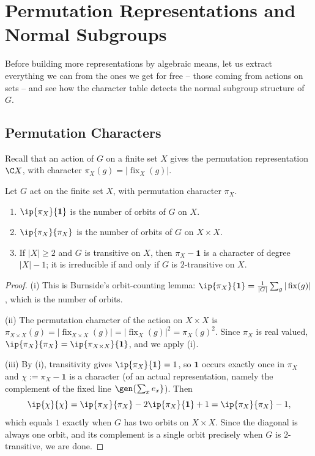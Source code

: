 \section{Permutation Representations and Normal Subgroups}

Before building more representations by algebraic means, let us extract everything we can from the ones we get for free -- those coming from actions on sets -- and see how the character table detects the normal subgroup structure of $G$.

\subsection{Permutation Characters}

Recall that an action of $G$ on a finite set $X$ gives the permutation representation $\C X$, with character $\pi_X(g) = |\operatorname{fix}_X(g)|$.

\begin{proposition}
	Let $G$ act on the finite set $X$, with permutation character $\pi_X$.
	\begin{enumerate}[label=(\roman*)]
		\item $\ip{\pi_X}{\mathbf 1}$ is the number of orbits of $G$ on $X$.
		\item $\ip{\pi_X}{\pi_X}$ is the number of orbits of $G$ on $X\times X$.
		\item If $|X| \geq 2$ and $G$ is transitive on $X$, then $\pi_X - \mathbf 1$ is a character of degree $|X|-1$; it is irreducible if and only if $G$ is $2$-transitive on $X$.
	\end{enumerate}
\end{proposition}
\begin{proof}
	(i) This is Burnside's orbit-counting lemma: $\ip{\pi_X}{\mathbf 1} = \frac1{|G|}\sum_g|\operatorname{fix}(g)|$, which is the number of orbits.

	(ii) The permutation character of the action on $X \times X$ is $\pi_{X\times X}(g) = |\operatorname{fix}_{X\times X}(g)| = |\operatorname{fix}_X(g)|^2 = \pi_X(g)^2$. Since $\pi_X$ is real valued, $\ip{\pi_X}{\pi_X} = \ip{\pi_{X\times X}}{\mathbf 1}$, and we apply (i).

	(iii) By (i), transitivity gives $\ip{\pi_X}{\mathbf 1} = 1$, so $\mathbf 1$ occurs exactly once in $\pi_X$ and $\chi := \pi_X - \mathbf 1$ is a character (of an actual representation, namely the complement of the fixed line $\gen{\sum_x e_x}$). Then
	$$\ip{\chi}{\chi} = \ip{\pi_X}{\pi_X} - 2\ip{\pi_X}{\mathbf 1} + 1 = \ip{\pi_X}{\pi_X} - 1,$$
	which equals $1$ exactly when $G$ has two orbits on $X\times X$. Since the diagonal is always one orbit, and its complement is a single orbit precisely when $G$ is $2$-transitive, we are done.
\end{proof}

